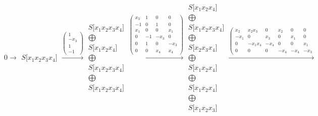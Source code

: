 \documentclass[12pt,a3paper,landscape]{amsart}
\numberwithin{equation}{section}
\theoremstyle{plain}
\theoremstyle{definition}
\begin{document}
$$
0 \rightarrow \begin{matrix}
S \lbrack x_{1}x_{2}x_{3}x_{4} \rbrack
\end{matrix}
\xrightarrow{\left( \begin{matrix}
1 \\
-x_{3} \\
1 \\
-1
\end{matrix} \right)}\begin{matrix}
S \lbrack x_{1}x_{2}x_{3}x_{4} \rbrack \\ \bigoplus \\
S \lbrack x_{1}x_{2}x_{4} \rbrack \\ \bigoplus \\
S \lbrack x_{1}x_{2}x_{3}x_{4} \rbrack \\ \bigoplus \\
S \lbrack x_{1}x_{2}x_{3}x_{4} \rbrack
\end{matrix}
\xrightarrow{\left( \begin{matrix}
x_{3} & 1 & 0 & 0 \\
-1 & 0 & 1 & 0 \\
x_{1} & 0 & 0 & x_{1} \\
0 & -1 & -x_{3} & 0 \\
0 & 1 & 0 & -x_{3} \\
0 & 0 & x_{4} & x_{4}
\end{matrix} \right)}\begin{matrix}
S \lbrack x_{1}x_{2}x_{4} \rbrack \\ \bigoplus \\
S \lbrack x_{1}x_{2}x_{3}x_{4} \rbrack \\ \bigoplus \\
S \lbrack x_{2}x_{3}x_{4} \rbrack \\ \bigoplus \\
S \lbrack x_{1}x_{2}x_{4} \rbrack \\ \bigoplus \\
S \lbrack x_{1}x_{2}x_{4} \rbrack \\ \bigoplus \\
S \lbrack x_{1}x_{2}x_{3} \rbrack
\end{matrix}
\xrightarrow{\left( \begin{matrix}
x_{2} & x_{2}x_{3} & 0 & x_{2} & 0 & 0 \\
-x_{1} & 0 & x_{3} & 0 & x_{1} & 0 \\
0 & -x_{1}x_{4} & -x_{4} & 0 & 0 & x_{1} \\
0 & 0 & 0 & -x_{4} & -x_{4} & -x_{3}

\end{matrix}}$$
\end{document}
